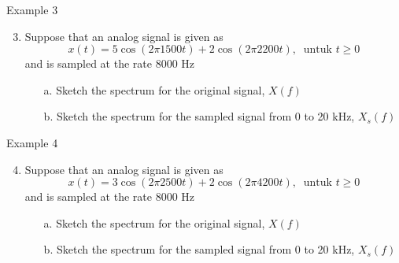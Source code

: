 \documentclass[pdflatex,compress,mathserif]{beamer}
\begin{document}
\begin{frame}{Example 3}
    \begin{enumerate}
        \setcounter{enumi}{2}
        \item Suppose that an analog signal is given as
        \begin{equation*}
            x(t) = 5 \cos (2 \pi 1500 t) + 2 \cos (2 \pi 2200 t),~\text{ untuk } t \geq 0
        \end{equation*}
        and is sampled at the rate 8000 Hz
        \begin{enumerate}
            \item[a.] Sketch the spectrum for the original signal, $X(f)$
            \item[b.] Sketch the spectrum for the sampled signal from 0 to 20 kHz, $X_s(f)$
        \end{enumerate}
    \end{enumerate}
\end{frame}

\begin{frame}{Example 4}
    \begin{enumerate}
        \setcounter{enumi}{3}
        \item Suppose that an analog signal is given as
        \begin{equation*}
            x(t) = 3 \cos (2 \pi 2500 t) + 2 \cos (2 \pi 4200 t),~\text{ untuk } t \geq 0
        \end{equation*}
        and is sampled at the rate 8000 Hz
        \begin{enumerate}
            \item[a.] Sketch the spectrum for the original signal, $X(f)$
            \item[b.] Sketch the spectrum for the sampled signal from 0 to 20 kHz, $X_s(f)$
        \end{enumerate}
    \end{enumerate}
\end{frame}
\end{document}
